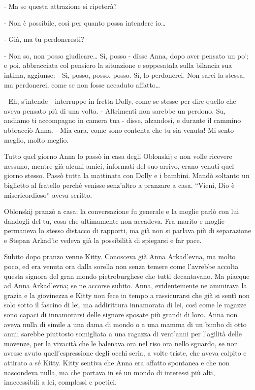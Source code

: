 - Ma se questa attrazione si ripeterà? 

- Non è possibile, così per quanto possa intendere io\ldots{} 

- Già, ma tu perdoneresti? 

- Non so, non posso giudicare\ldots{} Sì, posso - disse Anna, dopo aver pensato un po'; e poi, abbracciata col pensiero la situazione e soppesatala sulla bilancia sua intima, aggiunse: - Sì, posso, posso, posso. Sì, lo perdonerei. Non sarei la stessa, ma perdonerei, come se non fosse accaduto affatto\ldots{} 

- Eh, s'intende - interruppe in fretta Dolly, come se stesse per dire quello che aveva pensato più di una volta. - Altrimenti non sarebbe un perdono. Su, andiamo ti accompagno in camera tua - disse, alzandosi, e durante il cammino abbracciò Anna. - Mia cara, come sono contenta che tu sia venuta! Mi sento meglio, molto meglio. 

\label{xx} 

Tutto quel giorno Anna lo passò in casa degli Oblonskij e non volle ricevere nessuno, mentre già alcuni amici, informati del suo arrivo, erano venuti quel giorno stesso. Passò tutta la mattinata con Dolly e i bambini. Mandò soltanto un biglietto al fratello perché venisse senz'altro a pranzare a casa. ``Vieni, Dio è misericordioso'' aveva scritto. 

Oblonskij pranzò a casa; la conversazione fu generale e la moglie parlò con lui dandogli del tu, cosa che ultimamente non accadeva. Fra marito e moglie permaneva lo stesso distacco di rapporti, ma già non si parlava più di separazione e Stepan Arkad'ic vedeva già la possibilità di spiegarsi e far pace. 

Subito dopo pranzo venne Kitty. Conosceva già Anna Arkad'evna, ma molto poco, ed era venuta ora dalla sorella non senza temere come l'avrebbe accolta questa signora del gran mondo pietroburghese che tutti decantavano. Ma piacque ad Anna Arkad'evna; se ne accorse subito. Anna, evidentemente ne ammirava la grazia e la giovinezza e Kitty non fece in tempo a rassicurarsi che già si sentì non solo sotto il fascino di lei, ma addirittura innamorata di lei, così come le ragazze sono capaci di innamorarsi delle signore sposate più grandi di loro. Anna non aveva nulla di simile a una dama di mondo o a una mamma di un bimbo di otto anni; sarebbe piuttosto somigliata a una ragazza di vent'anni per l'agilità delle movenze, per la vivacità che le balenava ora nel riso ora nello sguardo, se non avesse avuto quell'espressione degli occhi seria, a volte triste, che aveva colpito e attirato a sé Kitty. Kitty sentiva che Anna era affatto spontanea e che non nascondeva nulla, ma che portava in sé un mondo di interessi più alti, inaccessibili a lei, complessi e poetici. 

